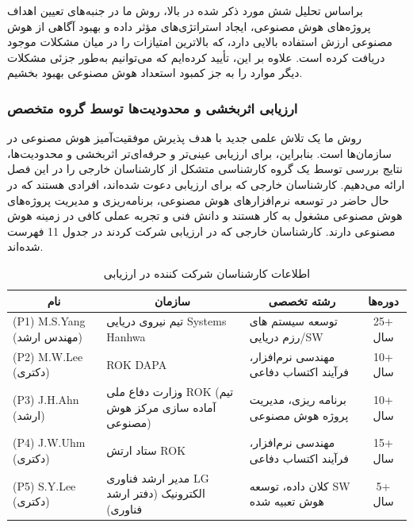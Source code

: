 \documentclass[a4paper,10pt]{article}
\begin{document}
                    براساس تحلیل شش مورد ذکر شده در بالا، روش ما در جنبه‌های تعیین اهداف پروژه‌های هوش مصنوعی، ایجاد استراتژی‌های مؤثر داده و بهبود آگاهی از هوش مصنوعی ارزش استفاده بالایی دارد، که بالاترین امتیازات را در میان مشکلات موجود دریافت کرده است. علاوه بر این، تأیید کرده‌ایم که می‌توانیم به‌طور جزئی مشکلات دیگر موارد را به جز کمبود استعداد هوش مصنوعی بهبود بخشیم.

                \subsubsection{ارزیابی اثربخشی و محدودیت‌ها توسط گروه متخصص}

                    روش ما یک تلاش علمی جدید با هدف پذیرش موفقیت‌آمیز هوش مصنوعی در سازمان‌ها است. بنابراین، برای ارزیابی عینی‌تر و حرفه‌ای‌تر اثربخشی و محدودیت‌ها، نتایج بررسی توسط یک گروه کارشناسی متشکل از کارشناسان خارجی را در این فصل ارائه می‌دهیم. کارشناسان خارجی که برای ارزیابی دعوت شده‌اند، افرادی هستند که در حال حاضر در توسعه نرم‌افزارهای هوش مصنوعی، برنامه‌ریزی و مدیریت پروژه‌های هوش مصنوعی مشغول به کار هستند و دانش فنی و تجربه عملی کافی در زمینه هوش مصنوعی دارند. کارشناسان خارجی که در ارزیابی شرکت کردند در جدول 11 فهرست شده‌اند.

                    \begin{table}
                        
                        \centering
                        \caption{اطلاعات کارشناسان شرکت کننده در ارزیابی}
                        \begin{tabularx}{\textwidth}{ p{4.5cm} p{5cm} p{6cm} c }
                            
                            \hline

                            \multicolumn{1}{c}{نام} & \multicolumn{1}{c}{سازمان} & \multicolumn{1}{c}{رشته تخصصی} & \multicolumn{1}{c}{دوره‌ها} \\

                            \hline

                            (P1) M.S.Yang (مهندس ارشد) & تیم نیروی دریایی Systems Hanhwa & توسعه سیستم های رزم دریایی/SW & 25+ سال \\
                            (P2) M.W.Lee (دکتری) & ROK DAPA	 & مهندسی نرم‌افزار، فرآیند اکتساب دفاعی & 10+ سال \\
                            (P3) J.H.Ahn (ارشد) & وزارت دفاع ملی ROK (تیم آماده سازی مرکز هوش مصنوعی) & برنامه ریزی، مدیریت پروژه هوش مصنوعی & 10+ سال \\
                            (P4) J.W.Uhm (دکتری) & ستاد ارتش ROK & مهندسی نرم‌افزار، فرآیند اکتساب دفاعی & 15+ سال \\
                            (P5) S.Y.Lee (دکتری) & مدیر ارشد فناوری LG الکترونیک (دفتر ارشد فناوری) & کلان داده، توسعه SW هوش تعبیه شده & 5+ سال \\

                            \hline

                        \end{tabularx}

                    \end{table}
\end{document}
